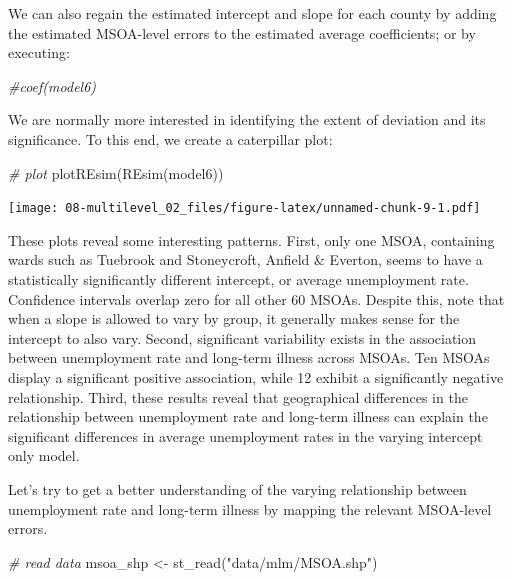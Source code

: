 \documentclass[
]{book}
\newenvironment{Shaded}{\begin{snugshade}}{\end{snugshade}}
\newcommand{\CommentTok}[1]{\textcolor[rgb]{0.56,0.35,0.01}{\textit{#1}}}
\newcommand{\FunctionTok}[1]{\textcolor[rgb]{0.00,0.00,0.00}{#1}}
\newcommand{\NormalTok}[1]{#1}
\newcommand{\OtherTok}[1]{\textcolor[rgb]{0.56,0.35,0.01}{#1}}
\newcommand{\StringTok}[1]{\textcolor[rgb]{0.31,0.60,0.02}{#1}}
\begin{document}
We can also regain the estimated intercept and slope for each county by adding the estimated MSOA-level errors to the estimated average coefficients; or by executing:

\begin{Shaded}
\begin{Highlighting}[]
\CommentTok{\#coef(model6)}
\end{Highlighting}
\end{Shaded}

We are normally more interested in identifying the extent of deviation and its significance. To this end, we create a caterpillar plot:

\begin{Shaded}
\begin{Highlighting}[]
\CommentTok{\# plot}
\FunctionTok{plotREsim}\NormalTok{(}\FunctionTok{REsim}\NormalTok{(model6))}
\end{Highlighting}
\end{Shaded}

\texttt{[image: 08-multilevel\_02\_files/figure-latex/unnamed-chunk-9-1.pdf]}

These plots reveal some interesting patterns. First, only one MSOA, containing wards such as Tuebrook and Stoneycroft, Anfield \& Everton, seems to have a statistically significantly different intercept, or average unemployment rate. Confidence intervals overlap zero for all other 60 MSOAs. Despite this, note that when a slope is allowed to vary by group, it generally makes sense for the intercept to also vary. Second, significant variability exists in the association between unemployment rate and long-term illness across MSOAs. Ten MSOAs display a significant positive association, while 12 exhibit a significantly negative relationship. Third, these results reveal that geographical differences in the relationship between unemployment rate and long-term illness can explain the significant differences in average unemployment rates in the varying intercept only model.

Let's try to get a better understanding of the varying relationship between unemployment rate and long-term illness by mapping the relevant MSOA-level errors.

\begin{Shaded}
\begin{Highlighting}[]
\CommentTok{\# read data}
\NormalTok{msoa\_shp }\OtherTok{\textless{}{-}} \FunctionTok{st\_read}\NormalTok{(}\StringTok{"data/mlm/MSOA.shp"}\NormalTok{)}
\end{Highlighting}
\end{Shaded}
\end{document}
